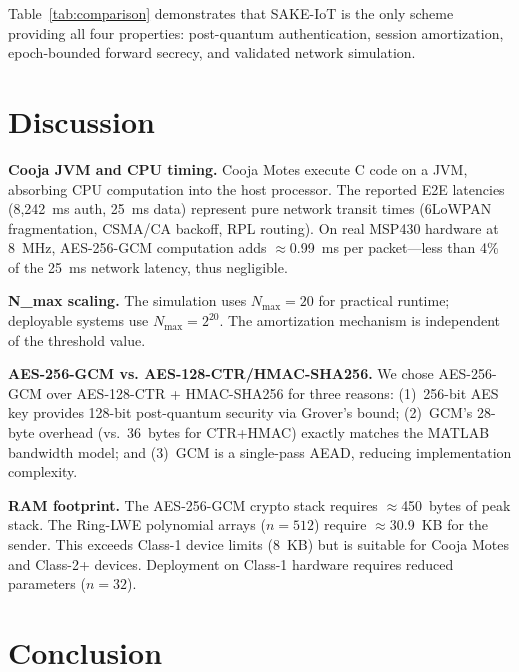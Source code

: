 \documentclass[conference]{IEEEtran}
\newcommand{\Nmax}{N_{\max}}
\begin{document}
Table~\ref{tab:comparison} demonstrates that SAKE-IoT is the only
scheme providing all four properties: post-quantum authentication,
session amortization, epoch-bounded forward secrecy, and validated
network simulation.

\section{Discussion}
\label{sec:discussion}

\textbf{Cooja JVM and CPU timing.} Cooja Motes execute C code on a
JVM, absorbing CPU computation into the host processor. The reported
E2E latencies (8,242~ms auth, 25~ms data) represent pure network
transit times (6LoWPAN fragmentation, CSMA/CA backoff, RPL routing).
On real MSP430 hardware at 8~MHz, AES-256-GCM computation adds
$\approx$0.99~ms per packet---less than 4\% of the 25~ms network
latency, thus negligible.

\textbf{N\_max scaling.} The simulation uses $\Nmax{=}20$ for
practical runtime; deployable systems use $\Nmax{=}2^{20}$. The
amortization mechanism is independent of the threshold value.

\textbf{AES-256-GCM vs. AES-128-CTR/HMAC-SHA256.} We chose
AES-256-GCM over AES-128-CTR + HMAC-SHA256 for three reasons:
(1)~256-bit AES key provides 128-bit post-quantum security via
Grover's bound; (2)~GCM's 28-byte overhead (vs.\ 36~bytes for
CTR+HMAC) exactly matches the MATLAB bandwidth model; and (3)~GCM is
a single-pass AEAD, reducing implementation complexity.

\textbf{RAM footprint.} The AES-256-GCM crypto stack requires
$\approx$450~bytes of peak stack. The Ring-LWE polynomial arrays
($n{=}512$) require $\approx$30.9~KB for the sender. This exceeds
Class-1 device limits (8~KB) but is suitable for Cooja Motes and
Class-2+ devices. Deployment on Class-1 hardware requires reduced
parameters ($n{=}32$).

\section{Conclusion}
\label{sec:conclusion}
\end{document}
